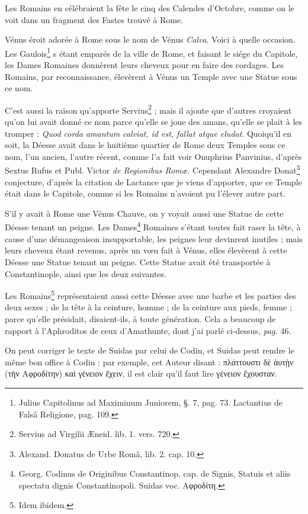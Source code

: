 \documentclass[a4paper, 11pt, oneside, polutonikogreek, french]{article}
\begin{document}
Les Romains en célébraient la fête le cinq des Calendes d'Octobre, comme on le voit dans un fragment des Fastes trouvé à Rome.

Vénus éroit adorée à Rome sous le nom de Vénus \emph{Calva}. Voici à quelle occasion. Les Gaulois\footnote{Julius Capitolinus ad Maximinum Juniorem, §. 7, pag. 73. Lactantius de Falsâ Religione, pag. 109.} s étant emparés de la ville de Rome, et faisant le siége du Capitole, les Dames Romaines donnèrent leurs cheveux pour en faire des cordages. Les Romains, par reconnaissance, élevèrent à Vénus un Temple avec une Statue sous ce nom.

C'est aussi la raison qu'apporte Servius\footnote{Servius ad Virgilii Æneid. lib. 1. vers. 720.} ; mais il ajoute que d'autres croyaient qu'on lui avait donné ce nom parce qu'elle se joue des amans, qu'elle se plait à les tromper : \emph{Quod corda amantum calviat, id est, fallat atque eludat}. Quoiqu'il en soit, la Déesse avait dans le huitième quartier de Rome deux Temples sous ce nom, l'un ancien, l'autre récent, comme l'a fait voir Onuphrius Panvinius, d'après Sextus Rufus et Publ. Victor \emph{de Regionibus Romæ}. Cependant Alexandre Donat\footnote{Alexand. Donatus de Urbe Româ, lib. 2. cap. 10.} conjecture, d'après la citation de Lactance que je viens d'apporter, que ce Temple était dans le Capitole, comme si les Romains n'avoient pu l'élever autre part.

S'il y avait à Rome une Vénus Chauve, on y voyait aussi une Statue de cette Déesse tenant un peigne. Les Dames\footnote{Georg. Codinus de Originibus Constantinop. cap. de Signis, Statuis et aliis spectatu dignis Constantinopoli. Suidas voc. Αφροδίτη.} Romaines s'étant toutes fait raser la tête, à cause d'une démangeaison insupportable, les peignes leur devinrent inutiles ; mais leurs cheveux étant revenus, après un vœu fait à Vénus, elles élevèrent à cette Déesse une Statue tenant un peigne. Cette Statue avait été transportée à Constantinople, ainsi que les deux suivantes.

Les Romains\footnote{Idem ibidem.} représentaient aussi cette Déesse avec une barbe et les parties des deux sexes ; de la tête à la ceinture, homme ; de la ceinture aux pieds, femme ; parce qu'elle présidait, disaient-ils, à toute génération. Cela a beaucoup de rapport à l'Aphroditos de ceux d'Amathunte, dont j'ai parlé ci-dessus, \emph{pag.} 46.

On peut corriger le texte de Suidas par celui de Codin, et Suidas peut rendre le même bon office à Codin : par exemple, cet Auteur disant : πλάττουστι δὲ ἀυτῂν (τὴν Αφροδίτην) καὶ γένειον ἔχειν, il est clair qu'il faut lire γένειον ἔχουσταν.
\end{document}
